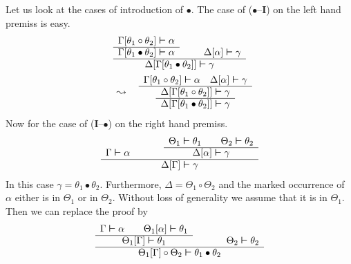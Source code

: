 Let us look at the cases of introduction of $\bullet$. The case of
($\bullet$--\textbf{I}) on the left hand premiss is easy.
\begin{multline}
\begin{array}{ccc}
\Gamma[\theta_1 \circ \theta_2] \bvdash \alpha & \quad &
\\\cline{1-1} \Gamma[\theta_1 \bullet \theta_2] \bvdash \alpha & &
\Delta[\alpha]
        \bvdash \gamma \\\hline
\multicolumn{3}{c}{\Delta[\Gamma[\theta_1 \bullet \theta_2]]
        \bvdash \gamma}
\end{array} \\
\quad\leadsto\quad
\begin{array}{c}
\Gamma[\theta_1 \circ \theta_2] \bvdash \alpha \quad
        \Delta[\alpha] \bvdash \gamma \\\hline
\begin{array}{c}
\Delta[\Gamma[\theta_1 \circ \theta_2]] \bvdash \gamma \\\hline
\Delta[\Gamma[\theta_1 \bullet \theta_2]] \bvdash \gamma
\end{array}
\end{array}
\end{multline}
Now for the case of (\textbf{I}--$\bullet$) on the right hand premiss.
\begin{equation}
\begin{array}{ccc}
 & \qquad & \Theta_1 \bvdash \theta_1 \qquad \Theta_2 \bvdash \theta_2
        \\\cline{3-3}
\Gamma \bvdash \alpha & & \Delta[\alpha] \bvdash \gamma \\\hline
\multicolumn{3}{c}{\Delta[\Gamma] \bvdash \gamma}
\end{array}
\end{equation}
In this case $\gamma = \theta_1 \bullet \theta_2$. Furthermore,
$\Delta = \Theta_1 \circ \Theta_2$ and the marked occurrence of
$\alpha$ either is in $\Theta_1$ or in $\Theta_2$. Without loss of
generality we assume that it is in $\Theta_1$. Then we can replace
the proof by
\begin{equation}
\begin{array}{ccc}
\Gamma \bvdash \alpha \qquad \Theta_1[\alpha] \bvdash \theta_1 & \qquad
        & \\\cline{1-1}
\Theta_1[\Gamma] \bvdash \theta_1 & & \Theta_2 \bvdash \theta_2 \\\hline
\multicolumn{3}{c}{\Theta_1[\Gamma] \circ \Theta_2 \bvdash
        \theta_1 \bullet \theta_2}
\end{array}
\end{equation}
